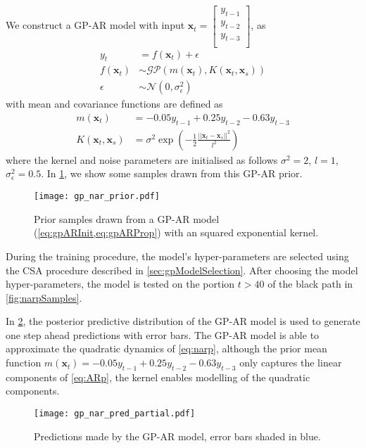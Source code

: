 We construct a GP-AR model with input 
$\mathbf{x}_t = \begin{bmatrix} y_{t-1}\\ y_{t-2}\\ y_{t-3}\\ \end{bmatrix}$, as
%
\begin{equation*}
    \begin{aligned}
        y_t &= f(\mathbf{x}_t) + \epsilon \\
        f(\mathbf{x}_t) &\sim \mathcal{GP}(m(\mathbf{x}_t), K(\mathbf{x}_t, \mathbf{x}_s)) \\
        \epsilon &\sim \mathcal{N}(0, \sigma_{\epsilon}^{2})
    \end{aligned}
\end{equation*}
%
with mean and covariance functions are defined as
\begin{equation*}
    \begin{aligned}
        m(\mathbf{x}_t) &=  -0.05 y_{t-1} + 0.25 y_{t-2} - 0.63 y_{t-3}\\
        K(\mathbf{x}_t, \mathbf{x}_s) &= \sigma^2 
        \exp \left(-\frac{1}{2} \frac{\rvert \rvert \mathbf{x}_t - \mathbf{x}_s \rvert \rvert ^2}{l^2} \right)
    \end{aligned}
\end{equation*}
where the kernel and noise parameters are initialised as follows $\sigma^2 = 2$, $l = 1$, 
$\sigma_{\epsilon}^{2} = 0.5$. In \cref{fig:gparPrior}, we show some samples drawn from this GP-AR prior.
%
\begin{figure}[ht]
    \centering
    \noindent\texttt{[image: gp\_nar\_prior.pdf]}
    \caption{Prior samples drawn from a GP-AR model (\cref{eq:gpARInit,eq:gpARProp}) with an squared exponential kernel.}
    \label{fig:gparPrior}
\end{figure}
%
During the training procedure, the model's hyper-parameters are selected using the CSA procedure described in 
\cref{sec:gpModelSelection}. After choosing the model hyper-parameters, the model is tested on the 
portion $t > 40$ of the black path in \cref{fig:narpSamples}. 

In \cref{fig:gparPost}, the posterior predictive distribution of the GP-AR model is used to generate one step ahead 
predictions with error bars. The GP-AR model is able to approximate the quadratic dynamics of \cref{eq:narp}, 
although the prior mean function $m(\mathbf{x}_t) =  -0.05 y_{t-1} + 0.25 y_{t-2} - 0.63 y_{t-3}$ only captures 
the linear components of \cref{eq:ARp}, the kernel enables modelling of the quadratic components.

\begin{figure}[ht]
    \centering
    \noindent\texttt{[image: gp\_nar\_pred\_partial.pdf]}
    \caption{Predictions made by the GP-AR model, error bars shaded in blue.}
    \label{fig:gparPost}
\end{figure}


